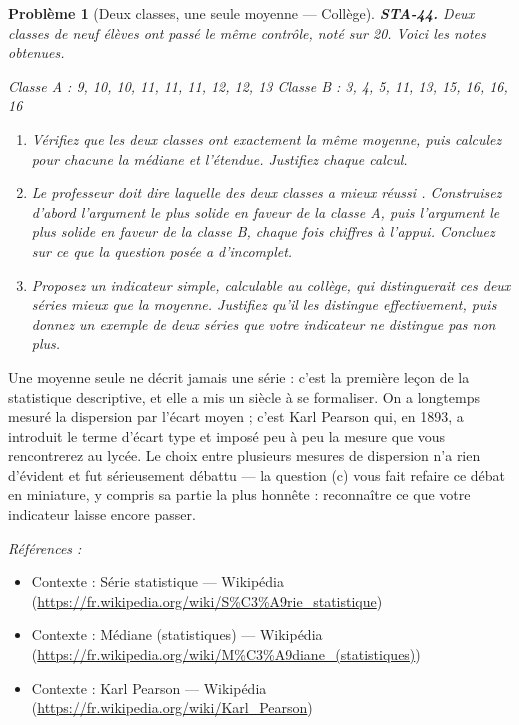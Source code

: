 \documentclass[11pt]{article}
\newtheorem{problem}{Problème}
\newenvironment{refs}{\par\small\noindent\emph{Références :}\begin{itemize}\setlength\itemsep{0pt}}{\end{itemize}\normalsize}
\begin{document}
\bigskip

\begin{problem}[{Deux classes, une seule moyenne --- Collège}]
\textbf{STA-44.} Deux classes de neuf élèves ont passé le même contrôle, noté sur 20. Voici les
notes obtenues.

\noindent Classe A : 9, 10, 10, 11, 11, 11, 12, 12, 13 
Classe B : 3, 4, 5, 11, 13, 15, 16, 16, 16
\begin{enumerate}
\item[(a)] Vérifiez que les deux classes ont exactement la même moyenne, puis calculez pour chacune la
médiane et l'étendue. Justifiez chaque calcul.
\item[(b)] Le professeur doit dire laquelle des deux classes \og{} a mieux réussi \fg{}. Construisez d'abord
l'argument le plus solide en faveur de la classe A, puis l'argument le plus solide en faveur de la
classe B, chaque fois chiffres à l'appui. Concluez sur ce que la question posée a d'incomplet.
\item[(c)] Proposez un indicateur simple, calculable au collège, qui distinguerait ces deux séries mieux
que la moyenne. Justifiez qu'il les distingue effectivement, puis donnez un exemple de deux séries
que votre indicateur ne distingue pas non plus.
\end{enumerate}

\end{problem}

\noindent Une moyenne seule ne décrit jamais une série : c'est la première leçon de la
statistique descriptive, et elle a mis un siècle à se formaliser. On a longtemps mesuré la
dispersion par l'écart moyen ; c'est Karl Pearson qui, en 1893, a introduit le terme d'écart type
et imposé peu à peu la mesure que vous rencontrerez au lycée. Le choix entre plusieurs mesures de
dispersion n'a rien d'évident et fut sérieusement débattu --- la question (c) vous fait refaire ce
débat en miniature, y compris sa partie la plus honnête : reconnaître ce que votre indicateur
laisse encore passer.

\begin{refs}
\item Contexte : Série statistique --- Wikipédia (\url{https://fr.wikipedia.org/wiki/S%C3%A9rie_statistique})
\item Contexte : Médiane (statistiques) --- Wikipédia (\url{https://fr.wikipedia.org/wiki/M%C3%A9diane_(statistiques)})
\item Contexte : Karl Pearson --- Wikipédia (\url{https://fr.wikipedia.org/wiki/Karl_Pearson})
\end{refs}
\end{document}
